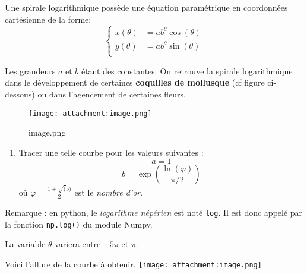 \documentclass[11pt]{article}
\providecommand{\tightlist}{%
      \setlength{\itemsep}{0pt}\setlength{\parskip}{0pt}}
\begin{document}
Une spirale logarithmique possède une équation paramétrique en
coordonnées cartésienne de la forme: \[\left\{
\begin{array}{ll}
        x(\theta) &= ab^\theta\cos(\theta) \\
        y(\theta) & =ab^\theta\sin(\theta) \\
    \end{array}
    \right.\]

Les grandeurs \(a\) et \(b\) étant des constantes. On retrouve la
spirale logarithmique dans le développement de certaines
\textbf{coquilles de mollusque} (cf figure ci-dessous) ou dans
l'agencement de certaines fleurs.

\begin{figure}
\centering
\texttt{[image: attachment:image.png]}
\caption{image.png}
\end{figure}

    \begin{enumerate}
\def\labelenumi{\alph{enumi})}
\tightlist
\item
  Tracer une telle courbe pour les valeurs suivantes : \[a=1\]
  \[b=\exp\left(\frac{\ln(\varphi)}{\pi/2}\right)\] où
  \(\varphi = \frac{1+\sqrt(5)}{2}\) est le \emph{nombre d'or}.
\end{enumerate}

Remarque : en python, le \emph{logarithme népérien} est noté
\texttt{log}. Il est donc appelé par la fonction \texttt{np.log()} du
module Numpy.

La variable \(\theta\) variera entre \(-5\pi\) et \(\pi\).

Voici l'allure de la courbe à obtenir.
\texttt{[image: attachment:image.png]}
\end{document}
